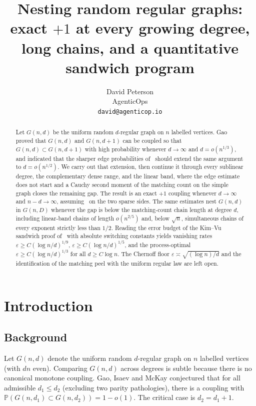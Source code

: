 \documentclass[11pt]{article}
\title{Nesting random regular graphs:\\
exact \(+1\) at every growing degree, long chains, and a quantitative sandwich program}
\author{David Peterson\\
AgenticOps\\
\texttt{david@agenticop.io}}
\date{}
\newcommand{\Gnd}{G(n,d)}
\newcommand{\PP}{\mathbb{P}}
\begin{document}
\maketitle

\begin{abstract}
Let \(G(n,d)\) be the uniform random \(d\)-regular graph on \(n\) labelled vertices.
Gao proved that \(G(n,d)\) and \(G(n,d+1)\) can be coupled so that
\(G(n,d)\subset G(n,d+1)\) with high probability whenever \(d\to\infty\) and
\(d=o(n^{1/3})\), and indicated that the sharper edge probabilities of~\cite{Gao20}
should extend the same argument to \(d=o(n^{1/2})\).
We carry out that extension, then continue it through every sublinear degree,
the complementary dense range, and the linear band, where the edge estimate does
not start and a Cauchy second moment of the matching count on the simple graph
closes the remaining gap.
The result is an exact \(+1\) coupling whenever \(d\to\infty\) and \(n-d\to\infty\),
assuming~\cite[Theorem~6]{Gao20} on the two sparse sides.
The same estimates nest \(G(n,d)\) in \(G(n,D)\) whenever the gap is below the
matching-count chain length at degree \(d\), including linear-band chains of
length \(o(n^{2/5})\) and, below \(\sqrt{n}\), simultaneous chains of every
exponent strictly less than \(1/2\).
Reading the error budget of the Kim--Vu sandwich proof of~\cite{BIM25} with
absolute switching constants yields vanishing rates
\(\varepsilon\ge C(\log n/d)^{1/9}\), \(\varepsilon\ge C(\log n/d)^{1/5}\), and the
process-optimal \(\varepsilon\ge C(\log n/d)^{1/3}\) for all \(d\ge C\log n\).
The Chernoff floor \(\varepsilon\asymp\sqrt{(\log n)/d}\) and the identification of
the matching peel with the uniform regular law are left open.
\end{abstract}

\tableofcontents

\section{Introduction}

\subsection{Background}
Let \(\Gnd\) denote the uniform random \(d\)-regular graph on \(n\) labelled vertices
(with \(dn\) even). Comparing \(\Gnd\) across degrees is subtle because there is no
canonical monotone coupling.
Gao, Isaev and McKay conjectured that for all admissible \(d_1\le d_2\)
(excluding two parity pathologies), there is a coupling with
\(\PP(G(n,d_1)\subset G(n,d_2))=1-o(1)\).
The critical case is \(d_2=d_1+1\).
\end{document}
